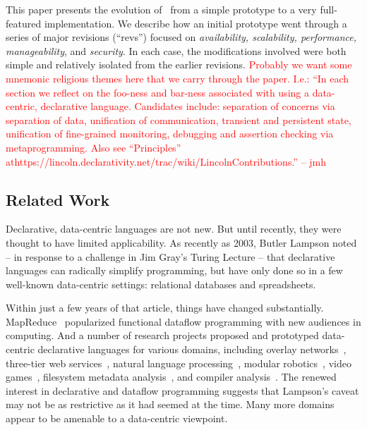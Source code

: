 \documentclass{sig-alternate}
\newcommand{\jmh}[1]{{\textcolor{red}{#1 -- jmh}}}
\begin{document}
This paper presents the evolution of \BOOM\ from a simple prototype to a very full-featured implementation.  We describe how an initial prototype went through a series of major revisions (``revs'') focused on {\em availability, scalability, performance, manageability}, and {\em security}.  In each case, the modifications involved were both simple and relatively isolated from the earlier revisions.  \jmh{Probably we want some mnemonic religious themes here that we carry through the paper. I.e.: ``In each section we reflect on the foo-ness and bar-ness associated with using a data-centric, declarative language.  Candidates include: separation of concerns via separation of data, unification of communication, transient and persistent state, unification of fine-grained monitoring, debugging and assertion checking via metaprogramming.  Also see ``Principles'' at\linebreak https://lincoln.declarativity.net/trac/wiki/LincolnContributions.''}


\subsection{Related Work}
\label{sec:relwork}
Declarative, data-centric languages are not new.  But until recently, they were thought to have limited applicability.  As recently as 2003, Butler Lampson noted -- in response to a challenge in Jim Gray's Turing Lecture -- that declarative languages can radically simplify programming, but have only done so in a few well-known data-centric settings: relational databases and spreadsheets. 

Within just a few years of that article, things have changed substantially.  MapReduce~\cite{mapreduce-osdi,hadoop} popularized functional dataflow programming with new audiences in computing.  And a number of research projects proposed and prototyped data-centric declarative languages for various domains, including overlay networks~\cite{p2}, three-tier web services~\cite{hilda}, natural language processing~\cite{dyna}, modular robotics~\cite{meld}, video games~\cite{cornellgames}, filesystem metadata analysis~\cite{wiscfsck}, and compiler analysis~\cite{bddbddb}. 
The renewed interest in declarative and dataflow programming suggests that Lampson's caveat may not be as restrictive as it had seemed at the time.  Many more domains appear to be amenable to a data-centric viewpoint.
\end{document}
